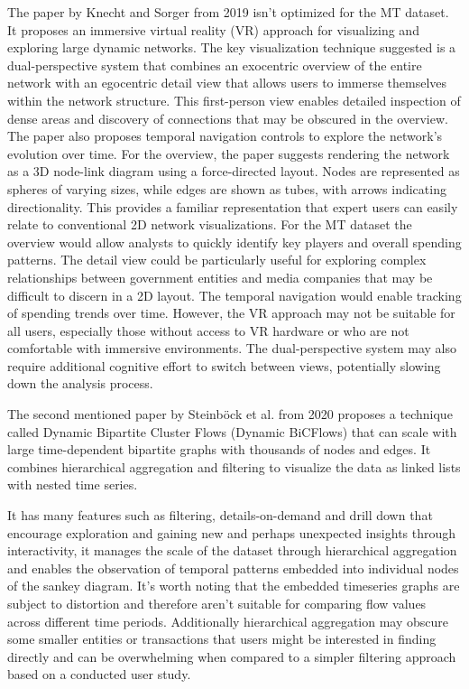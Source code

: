 \documentclass{vgtc}
\begin{document}
The paper by Knecht and Sorger from 2019 \cite{sorger2019immersive} isn't optimized for the MT dataset. It proposes an immersive virtual reality (VR) approach for visualizing and exploring large dynamic networks. The key visualization technique suggested is a dual-perspective system that combines an exocentric overview of the entire network with an egocentric detail view that allows users to immerse themselves within the network structure. This first-person view enables detailed inspection of dense areas and discovery of connections that may be obscured in the overview. The paper also proposes temporal navigation controls to explore the network's evolution over time. For the overview, the paper suggests rendering the network as a 3D node-link diagram using a force-directed layout. Nodes are represented as spheres of varying sizes, while edges are shown as tubes, with arrows indicating directionality. This provides a familiar representation that expert users can easily relate to conventional 2D network visualizations.
For the MT dataset the overview would allow analysts to quickly identify key players and overall spending patterns. The detail view could be particularly useful for exploring complex relationships between government entities and media companies that may be difficult to discern in a 2D layout. The temporal navigation would enable tracking of spending trends over time. However, the VR approach may not be suitable for all users, especially those without access to VR hardware or who are not comfortable with immersive environments. The dual-perspective system may also require additional cognitive effort to switch between views, potentially slowing down the analysis process.

\medskip

The second mentioned paper by Steinböck et al. from 2020 \cite{Waldner2020InteractiveEO} proposes a technique called Dynamic Bipartite Cluster Flows (Dynamic BiCFlows) that can scale with large time-dependent bipartite graphs with thousands of nodes and edges. It combines hierarchical aggregation and filtering to visualize the data as linked lists with nested time series.

It has many features such as filtering, details-on-demand and drill down that encourage exploration and gaining new and perhaps unexpected insights through interactivity, it manages the scale of the dataset through hierarchical aggregation and enables the observation of temporal patterns embedded into individual nodes of the sankey diagram. It's worth noting that the embedded timeseries graphs are subject to distortion and therefore aren't suitable for comparing flow values across different time periods. Additionally hierarchical aggregation may obscure some smaller entities or transactions that users might be interested in finding directly and can be overwhelming when compared to a simpler filtering approach based on a conducted user study.
\end{document}

